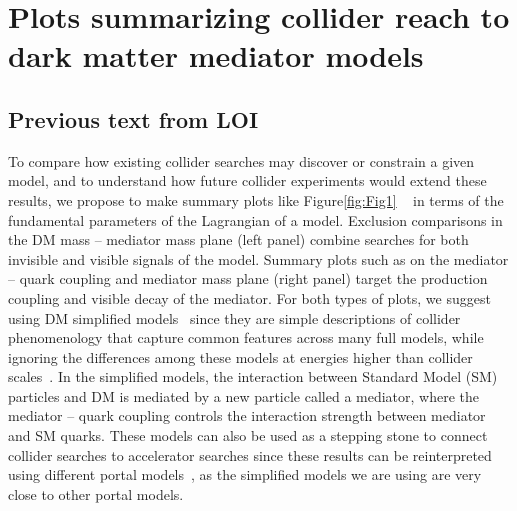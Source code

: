 \documentclass[11pt]{article}
\begin{document}
\section{Plots summarizing collider reach to dark matter mediator models}

\subsection{Previous text from LOI}

To compare how existing collider searches may discover or constrain a given model, and to understand how future collider experiments would extend these results, we propose to make summary plots like Figure\ref{fig:Fig1} ~\cite{CMSSummary,ATL-PHYS-DMSUM-JHEP-2019} in terms of the fundamental parameters of the Lagrangian of a model. 
Exclusion comparisons in the DM mass – mediator mass plane (left panel) combine searches for both invisible and visible signals of the model. Summary plots such as on the mediator – quark coupling and mediator mass plane (right panel) target the production coupling and visible decay of the mediator. For both types of plots, we suggest using DM simplified models~\cite{ABERCROMBIE2020100371} since they are simple descriptions of collider phenomenology that capture common features across many full models, while ignoring the differences among these models at energies higher than collider scales~\cite{doi:10.1146/annurev-nucl-101917-021008}. In the simplified models, the interaction between Standard Model (SM) particles and DM is mediated by a new particle called a mediator, where the mediator – quark coupling controls the interaction strength between mediator and SM quarks. These models can also be used as a stepping stone to connect collider searches to accelerator searches since these results can be reinterpreted using different portal models~\cite{Beacham:2652223}, as the simplified models we are using are very close to other portal models. 
\end{document}
